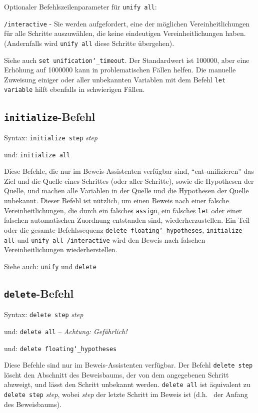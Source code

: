 Optionaler Befehlszeilenparameter für \texttt{unify all}:

    \texttt{/interactive} - Sie werden aufgefordert, eine der möglichen Vereinheitlichungen für alle Schritte auszuwählen, die keine eindeutigen Vereinheitlichungen haben.  (Andernfalls wird \texttt{unify all} diese Schritte übergehen).

Siehe auch \texttt{set unification{\char`\_}timeout}.  Der Standardwert ist 100000, aber eine Erhöhung auf 1000000 kann in problematischen Fällen helfen.  Die manuelle Zuweisung einiger oder aller unbekannten Variablen mit dem Befehl \texttt{let variable} hilft ebenfalls in schwierigen Fällen. 


\subsection{\texttt{initialize}-Befehl}

Syntax:  \texttt{initialize step} {\em step}

    und: \texttt{initialize all}

Diese Befehle, die nur im Beweis-Assistenten verfügbar sind, "`ent-unifizie\-ren"' das Ziel und die Quelle eines Schrittes (oder aller Schritte), sowie die Hypothesen der Quelle, und machen alle Variablen in der Quelle und die Hypothesen der Quelle unbekannt.  Dieser Befehl ist nützlich, um einen Beweis nach einer falsche Vereinheitlichungen, die durch ein falsches \texttt{assign}, ein falsches \texttt{let} oder einer falschen automatischen Zuordnung entstanden sind, wiederherzustellen.  Ein Teil oder die gesamte Befehlssequenz \texttt{delete floating{\char`\_}hypotheses}, \texttt{initialize all} und \texttt{unify all /interactive} wird den Beweis nach falschen Vereinheitlichungen wiederherstellen.

Siehe auch:  \texttt{unify} und \texttt{delete}


\subsection{\texttt{delete}-Befehl}
Syntax:  \texttt{delete step} {\em step}

   und:      \texttt{delete all} -- {\em Achtung: Gefährlich!}

   und:      \texttt{delete floating{\char`\_}hypotheses}

Diese Befehle sind nur im Beweis-Assistenten verfügbar.  Der Befehl \texttt{delete step} löscht den Abschnitt des Beweisbaums, der von dem angegebenen Schritt abzweigt, und lässt den Schritt unbekannt werden. \texttt{delete all} ist äquivalent zu \texttt{delete step} {\em step}, wobei {\em step} der letzte Schritt im Beweis ist (d.h. \ der Anfang des Beweisbaums). 


